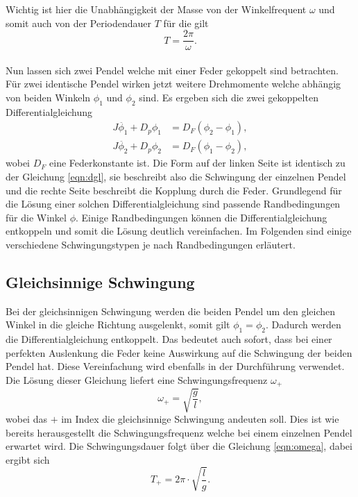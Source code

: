 Wichtig ist hier die Unabhängigkeit der Masse von der Winkelfrequent $\omega$ und somit auch von der Periodendauer $T$ für die gilt
\begin{equation}
    \label{eqn:omega}
T = \frac{2\pi}{\omega}.
\end{equation}
\\
\newline
Nun lassen sich zwei Pendel welche mit einer Feder gekoppelt sind betrachten. Für zwei identische Pendel wirken jetzt weitere Drehmomente welche abhängig von beiden Winkeln $\phi_{1}$ und $\phi_{2}$ sind. 
Es ergeben sich die zwei gekoppelten Differentialgleichung
\begin{align}
    \label{eqn:y1}
    J \ddot{{\phi_{1}}} + D_{p} \phi_{1} &=  D_{F} (\phi_{2}-\phi_{1}), \\
    \label{eqn:y2}
    J \ddot{{\phi_{2}}} + D_{p} \phi_{2} &= D_{F} (\phi_{1} - \phi_{2}),
\end{align}
wobei $D_{F}$ eine Federkonstante ist. Die Form auf der linken Seite ist identisch zu der Gleichung \eqref{eqn:dgl}, sie beschreibt also die Schwingung der einzelnen Pendel und die rechte Seite beschreibt die Kopplung
durch die Feder. Grundlegend für die Lösung einer solchen Differentialgleichung sind passende Randbedingungen für die Winkel $\phi$. Einige Randbedingungen können die Differentialgleichung entkoppeln und somit die Lösung
deutlich vereinfachen. Im Folgenden sind einige verschiedene Schwingungstypen je nach Randbedingungen erläutert.

\subsection{Gleichsinnige Schwingung}
Bei der gleichsinnigen Schwingung werden die beiden Pendel um den gleichen Winkel in die gleiche Richtung ausgelenkt, somit gilt $\phi_{1} = \phi_{2}$. Dadurch werden die Differentialgleichung entkoppelt.
Das bedeutet auch sofort, dass bei einer perfekten Auslenkung die Feder keine Auswirkung auf die Schwingung der beiden Pendel hat. Diese Vereinfachung wird ebenfalls in der Durchführung verwendet.
Die Lösung dieser Gleichung liefert eine Schwingungsfrequenz $\omega_{+}$
\begin{equation}
    \omega_{+} = \sqrt{\frac{g}{l}},
\end{equation}
wobei das $+$ im Index die gleichsinnige Schwingung andeuten soll. Dies ist wie bereits herausgestellt die Schwingungsfrequenz welche bei einem einzelnen Pendel erwartet wird.
Die Schwingungsdauer folgt über die Gleichung \eqref{eqn:omega}, dabei ergibt sich
\begin{equation}
T_{+} = 2\pi \cdot \sqrt{\frac{l}{g}}.
\end{equation}

